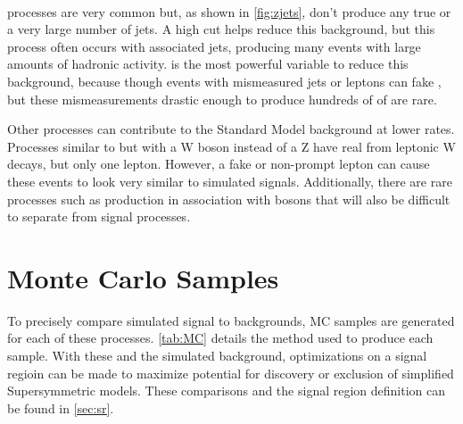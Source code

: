 \paragraph{\dyjets} processes are very common but, as shown in \autoref{fig:zjets}, don't produce any true \MET or a very large number of jets. A high \HT cut helps reduce this background, but this process often occurs with associated jets, producing many events with large amounts of hadronic activity. \MET is the most powerful variable to reduce this background, because though events with mismeasured jets or leptons can fake \MET, but these mismeasurements drastic enough to produce hundreds of \gev of \met are rare. 

Other processes can contribute to the Standard Model background at lower rates. Processes similar to \dyjets but with a W boson instead of a Z have real \MET from leptonic W decays, but only one lepton. However, a fake or non-prompt lepton can cause these events to look very similar to simulated signals. Additionally, there are rare processes such as \ttbar production in association with bosons that will also be difficult to separate from signal processes.

\section{Monte Carlo Samples} 

To precisely compare simulated signal to backgrounds, \ac{MC} samples are generated for each of these processes. \autoref{tab:MC} details the method used to produce each sample. With these and the simulated background, optimizations on a signal regioin can be made to maximize potential for discovery or exclusion of simplified Supersymmetric models. These comparisons and the signal region definition can be found in \autoref{sec:sr}.

